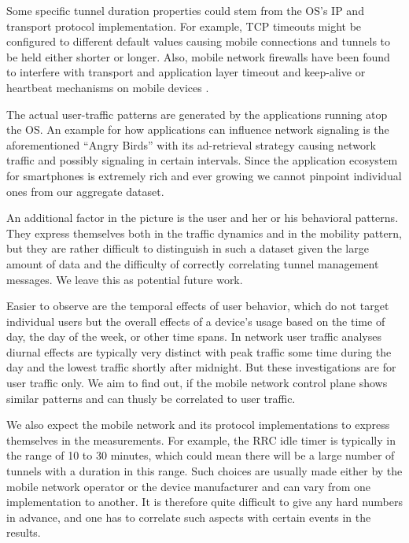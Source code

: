 Some specific tunnel duration properties could stem from the \ac{OS}'s IP and transport protocol implementation. For example, TCP timeouts might be configured to different default values causing mobile connections and tunnels to be held either shorter or longer. Also, mobile network firewalls have been found to interfere with transport and application layer timeout and keep-alive or heartbeat mechanisms on mobile devices \cite{sigcomm11middleboxes}.

The actual user-traffic patterns are generated by the applications running atop the OS. An example for how applications can influence network signaling is the aforementioned ``Angry Birds'' with its ad-retrieval strategy causing network traffic and possibly signaling in certain intervals. Since the application ecosystem for smartphones is extremely rich and ever growing we cannot pinpoint individual ones from our aggregate dataset.

An additional factor in the picture is the user and her or his behavioral patterns. They express themselves both in the traffic dynamics and in the mobility pattern, but they are rather difficult to distinguish in such a dataset given the large amount of data and the difficulty of correctly correlating tunnel management messages. We leave this as potential future work.

Easier to observe are the temporal effects of user behavior, which do not target individual users but the overall effects of a device's usage based on the time of day, the day of the week, or other time spans. In network user traffic analyses diurnal effects are typically very distinct with peak traffic some time during the day and the lowest traffic shortly after midnight. But these investigations are for user traffic only. We aim to find out, if the mobile network control plane shows similar patterns and can thusly be correlated to user traffic.

We also expect the mobile network and its protocol implementations to express themselves in the measurements. For example, the \ac{RRC} idle timer is typically in the range of 10 to 30 minutes, which could mean there will be a large number of tunnels with a duration in this range. Such choices are usually made either by the mobile network operator or the device manufacturer and can vary from one implementation to another. It is therefore quite difficult to give any hard numbers in advance, and one has to correlate such aspects with certain events in the results.



